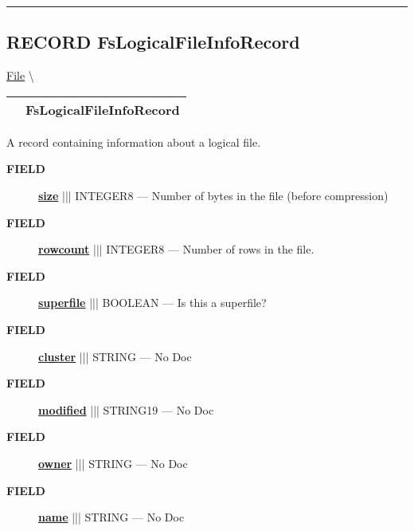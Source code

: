 \rule{\linewidth}{0.5pt}
\subsection*{\textsf{\colorbox{headtoc}{\color{white} RECORD}
FsLogicalFileInfoRecord}}

\hypertarget{ecldoc:file.fslogicalfileinforecord}{}
\hspace{0pt} \hyperlink{ecldoc:File}{File} \textbackslash 

{\renewcommand{\arraystretch}{1.5}
\begin{tabularx}{\textwidth}{|>{\raggedright\arraybackslash}l|X|}
\hline
\hspace{0pt}\mytexttt{\color{red} } & \textbf{FsLogicalFileInfoRecord} \\
\hline
\end{tabularx}
}

\par





A record containing information about a logical file.







\par
\begin{description}
\item [\colorbox{tagtype}{\color{white} \textbf{\textsf{FIELD}}}] \textbf{\underline{size}} ||| INTEGER8 --- Number of bytes in the file (before compression)
\item [\colorbox{tagtype}{\color{white} \textbf{\textsf{FIELD}}}] \textbf{\underline{rowcount}} ||| INTEGER8 --- Number of rows in the file.
\item [\colorbox{tagtype}{\color{white} \textbf{\textsf{FIELD}}}] \textbf{\underline{superfile}} ||| BOOLEAN --- Is this a superfile?
\item [\colorbox{tagtype}{\color{white} \textbf{\textsf{FIELD}}}] \textbf{\underline{cluster}} ||| STRING --- No Doc
\item [\colorbox{tagtype}{\color{white} \textbf{\textsf{FIELD}}}] \textbf{\underline{modified}} ||| STRING19 --- No Doc
\item [\colorbox{tagtype}{\color{white} \textbf{\textsf{FIELD}}}] \textbf{\underline{owner}} ||| STRING --- No Doc
\item [\colorbox{tagtype}{\color{white} \textbf{\textsf{FIELD}}}] \textbf{\underline{name}} ||| STRING --- No Doc
\end{description}







